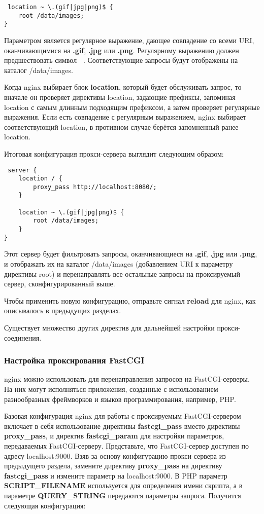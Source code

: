 \documentclass[a4paper,10pt,twoside]{article}
\begin{document}
\begin{verbatim}
 location ~ \.(gif|jpg|png)$ {
    root /data/images;
}
\end{verbatim} 
Параметром является регулярное выражение, дающее совпадение со всеми URI, оканчивающимися на \textbf{.gif}, \textbf{.jpg} или \textbf{.png}. Регулярному выражению должен предшествовать символ \textbf{~}. Соответствующие запросы будут отображены на каталог /data/images.

Когда nginx выбирает блок \textbf{location}, который будет обслуживать запрос, то вначале он проверяет директивы location, задающие префиксы, запоминая location с самым длинным подходящим префиксом, а затем проверяет регулярные выражения. Если есть совпадение с регулярным выражением, nginx выбирает соответствующий location, в противном случае берётся запомненный ранее location.

Итоговая конфигурация прокси-сервера выглядит следующим образом:

\begin{verbatim}
 server {
    location / {
        proxy_pass http://localhost:8080/;
    }

    location ~ \.(gif|jpg|png)$ {
        root /data/images;
    }
}
\end{verbatim} 
Этот сервер будет фильтровать запросы, оканчивающиеся на \textbf{.gif}, \textbf{.jpg} или \textbf{.png}, и отображать их на каталог /data/images (добавлением URI к параметру директивы root) и перенаправлять все остальные запросы на проксируемый сервер, сконфигурированный выше.

Чтобы применить новую конфигурацию, отправьте сигнал \textbf{reload} для nginx, как описывалось в предыдущих разделах.

Существует множество других директив для дальнейшей настройки прокси-соединения.

\subsubsection{Настройка проксирования FastCGI}
nginx можно использовать для перенаправления запросов на FastCGI-серверы. На них могут исполняться приложения, созданные с использованием разнообразных фреймворков и языков программирования, например, PHP.

Базовая конфигурация nginx для работы с проксируемым FastCGI-сервером включает в себя использование директивы \textbf{fastcgi\_pass} вместо директивы \textbf{proxy\_pass}, и директив \textbf{fastcgi\_param} для настройки параметров, передаваемых FastCGI-серверу. Представьте, что FastCGI-сервер доступен по адресу localhost:9000. Взяв за основу конфигурацию прокси-сервера из предыдущего раздела, замените директиву \textbf{proxy\_pass} на директиву \textbf{fastcgi\_pass} и измените параметр на localhost:9000. В PHP параметр \textbf{SCRIPT\_FILENAME} используется для определения имени скрипта, а в параметре \textbf{QUERY\_STRING} передаются параметры запроса. Получится следующая конфигурация:
\end{document}
